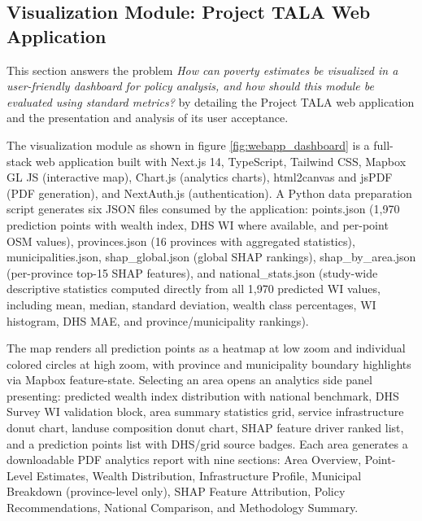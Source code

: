 \documentclass[12pt, letterpaper]{article}
\numberwithin{figure}{section}
\numberwithin{table}{section}
\begin{document}
\subsection{Visualization Module: Project TALA Web Application}
This section answers the problem \emph{How can poverty estimates be
  visualized in a user-friendly dashboard for policy analysis, and how
should this module be evaluated using standard metrics?} by detailing
the Project TALA web application and the presentation and analysis of
its user acceptance.

The visualization module as shown in figure
\ref{fig:webapp_dashboard} is a full-stack web application built with
Next.js 14, TypeScript, Tailwind CSS, Mapbox GL JS (interactive map),
Chart.js (analytics charts), html2canvas and jsPDF (PDF generation),
and NextAuth.js (authentication). A Python data preparation script
generates six JSON files consumed by the application: points.json
(1,970 prediction points with wealth index, DHS WI where available,
and per-point OSM values), provinces.json (16 provinces with
aggregated statistics), municipalities.json, shap\_global.json
(global SHAP rankings), shap\_by\_area.json (per-province top-15 SHAP
features), and national\_stats.json (study-wide descriptive
  statistics computed directly from all 1,970 predicted WI values,
  including mean, median, standard deviation, wealth class percentages,
WI histogram, DHS MAE, and province/municipality rankings).

The map renders all prediction points as a heatmap at low zoom and
individual colored circles at high zoom, with province and
municipality boundary highlights via Mapbox feature-state. Selecting
an area opens an analytics side panel presenting: predicted wealth
index distribution with national benchmark, DHS Survey WI validation
block, area summary statistics grid, service infrastructure donut
chart, landuse composition donut chart, SHAP feature driver ranked
list, and a prediction points list with DHS/grid source badges. Each
area generates a downloadable PDF analytics report with nine
sections: Area Overview, Point-Level Estimates, Wealth Distribution,
Infrastructure Profile, Municipal Breakdown (province-level only),
SHAP Feature Attribution, Policy Recommendations, National
Comparison, and Methodology Summary.
\end{document}
